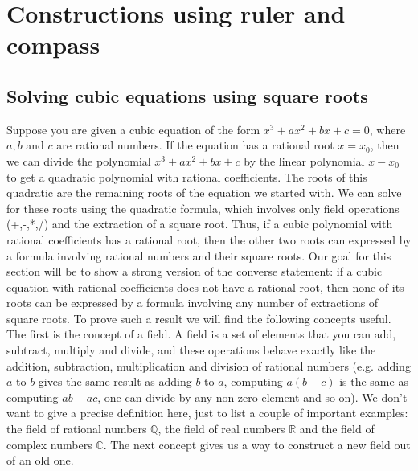 \chapter{Constructions using ruler and compass}
\section{Solving cubic equations using square roots}
Suppose you are given a cubic equation of the form $x^3+a x^2+b x+c=0$, where $a,b$ and $c$ are rational numbers. If the equation has a rational root $x=x_0$, then we can divide the polynomial $x^3+a x^2+b x+c$ by the linear polynomial $x-x_0$ to get a quadratic polynomial with rational coefficients. The roots of this quadratic are the remaining roots of the equation we started with. We can solve for these roots using the quadratic formula, which involves only field operations (+,-,*,/) and the extraction of a square root. Thus, if a cubic polynomial with rational coefficients has a rational root, then the other two roots can expressed by a formula involving rational numbers and their square roots.
Our goal for this section will be to show a strong version of the converse statement: if a cubic equation with rational coefficients does not have a rational root, then none of its roots can be expressed by a formula involving any number of extractions of square roots.
To prove such a result we will find the following concepts useful. The first is the concept of a field. A field is a set of elements that you can add, subtract, multiply and divide, and these operations behave exactly like the addition, subtraction, multiplication and division of rational numbers (e.g. adding $a$ to $b$ gives the same result as adding $b$ to $a$, computing $a(b-c)$ is the same as computing $ab-ac$, one can divide by any non-zero element and so on). We don't want to give a precise definition here, just to list a couple of important examples: the field of rational numbers $\mathbb{Q}$, the field of real numbers $\mathbb{R}$ and the field of complex numbers $\mathbb{C}$. The next concept gives us a way to construct a new field out of an old one.

